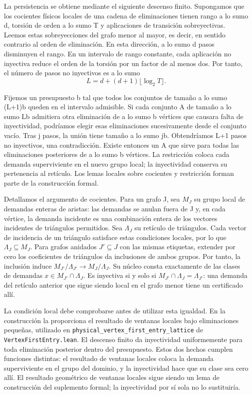 \documentclass[spanish,11pt,a4paper]{article}
\begin{document}
La persistencia se obtiene mediante el siguiente descenso finito. Supongamos que los cocientes físicos locales de una cadena de eliminaciones tienen rango a lo sumo d, torsión de orden a lo sumo T y aplicaciones de transición sobreyectivas. Leemos estas sobreyecciones del grafo menor al mayor, es decir, en sentido contrario al orden de eliminación. En esta dirección, a lo sumo d pasos disminuyen el rango. En un intervalo de rango constante, cada aplicación no inyectiva reduce el orden de la torsión por un factor de al menos dos. Por tanto, el número de pasos no inyectivos es a lo sumo
\[L=d+(d+1)\lfloor\log_2T\rfloor. \tag{D.1}\]

Fijemos un presupuesto b tal que todos los conjuntos de tamaño a lo sumo (L+1)b queden en el intervalo admisible. Si cada conjunto A de tamaño a lo sumo Lb admitiera otra eliminación de a lo sumo b vértices que causara falta de inyectividad, podríamos elegir esas eliminaciones sucesivamente desde el conjunto vacío. Tras j pasos, la unión tiene tamaño a lo sumo jb. Obtendríamos L+1 pasos no inyectivos, una contradicción. Existe entonces un A que sirve para todas las eliminaciones posteriores de a lo sumo b vértices. La restricción coloca cada demanda superviviente en el nuevo grupo local; la inyectividad conserva su pertenencia al retículo. Los lemas locales sobre cocientes y restricción forman parte de la construcción formal.

Detallamos el argumento de cocientes. Para un grafo J, sea \(M_J\) su grupo local de demandas enteras de aristas: las demandas se anulan fuera de J y, en cada vértice, la demanda incidente es una combinación entera de los vectores incidentes de triángulos permitidos. Sea \(\Lambda_J\) su retículo de triángulos. Cada vector de incidencia de un triángulo satisface estas condiciones locales, por lo que \(\Lambda_J\subseteq M_J\). Para grafos anidados \(J'\subseteq J\) con las mismas etiquetas, extender por cero los coeficientes de triángulos da inclusiones de ambos grupos. Por tanto, la inclusión induce \(M_{J'}/\Lambda_{J'}\longrightarrow M_J/\Lambda_J\). Su núcleo consta exactamente de las clases de demandas \(x\in M_{J'}\cap\Lambda_J\). Es inyectiva si y solo si \(M_{J'}\cap\Lambda_J=\Lambda_{J'}\): una demanda del retículo anterior que sigue siendo local en el grafo menor tiene un certificado allí.

La condición local debe comprobarse antes de utilizar esta igualdad. En la construcción la proporciona el resultado de ventanas locales bajo eliminaciones pequeñas, utilizado en \texttt{physical\_\allowbreak{}vertex\_\allowbreak{}first\_\allowbreak{}entry\_\allowbreak{}lattice} de \texttt{Vertex\allowbreak{}First\allowbreak{}Entry.\allowbreak{}lean}. El descenso finito da inyectividad uniformemente para toda eliminación posterior dentro del presupuesto. Estos dos hechos cumplen funciones distintas: el resultado de ventanas locales coloca la demanda superviviente en el grupo del dominio, y la inyectividad hace que su clase sea cero allí. El resultado geométrico de ventanas locales sigue siendo un lema de construcción del suplemento formal; la inyectividad por sí sola no lo sustituiría.
\end{document}
